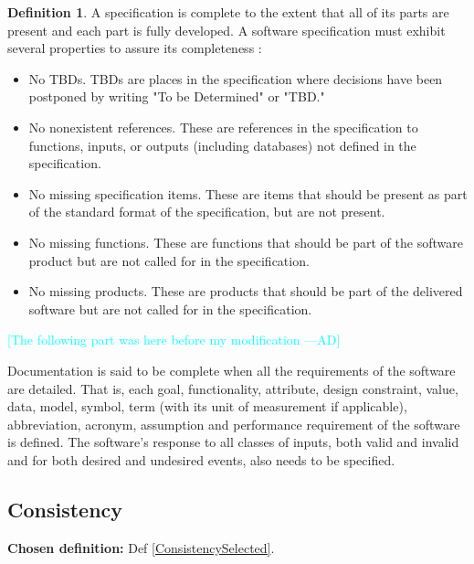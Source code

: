 \documentclass[letterpaper,cleveref]{lipics-v2019}
\newcommand{\authornote}[3]{\textcolor{#1}{[#3 ---#2]}}
\newcommand{\authornote}[3]{}
\newcommand{\ad}[1]{\authornote{cyan}{AD}{#1}} %
\theoremstyle{definition}
\newtheorem{defn}{Definition}
\begin{document}
\begin{defn}
\label{CompletenessSelected}
A specification is complete to the extent that all of its parts are present and each part is fully developed. A software specification must exhibit several properties to assure its completeness \citep{Boehm1984}:
\begin{itemize}
\item No TBDs. TBDs are places in the specification where decisions have been postponed by writing "To be Determined" or "TBD."
\item No nonexistent references. These are references in the specification to functions, inputs, or outputs (including databases) not defined in the specification.
\item No missing specification items. These are items that should be present as part of the standard format of the specification, but are not present.
\item No missing functions. These are functions that should be part of the software product but are not called for in the specification.
\item No missing products. These are products that should be part of the delivered software but are not called for in the specification.
\end{itemize}
\end{defn}

\ad{The following part was here before my modification}

Documentation is said to be complete when all the requirements of the software are detailed. That is, each goal, functionality, attribute, design constraint, value, data, model, symbol, term (with its unit of measurement if applicable), abbreviation, acronym, assumption and performance requirement of the software is defined.  The software's response to all classes of inputs, both valid and invalid and for both desired and undesired events, also needs to be specified.

\subsection{Consistency}
\noindent \textbf{Chosen definition:} Def \ref{ConsistencySelected}.
\end{document}
